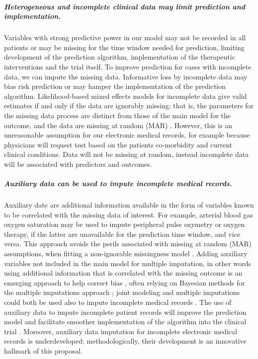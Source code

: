 \documentclass[11pt,notitlepage]{article}
\begin{document}
\subparagraph*{Heterogeneous and incomplete clinical data may limit prediction and implementation.}
Variables with strong predictive power in our model may not be recorded in all patients or may be missing for the time window needed for prediction, limiting development of the prediction algorithm, implementation of the therapeutic interventions and the trial itself. To improve prediction for cases with incomplete data, we can impute the missing data. Informative loss by incomplete data may bias risk prediction or may hamper the implementation of the prediction algorithm. Likelihood-based mixed effects models for incomplete data give valid estimates if and only if the data are ignorably missing; that is, the parameters for the missing data process are distinct from those of the main model for the outcome, and the data are missing at random (MAR) \cite{Rubin_1976}. However, this is an unreasonable assumption for our electronic medical records, for example because physicians will request test based on the patients co-morbidity and current clinical conditions. Data will not be missing at random, instead incomplete data will be associated with predictors and outcomes.

\subparagraph*{Auxiliary data can be used to impute incomplete medical records.}
Auxiliary date are additional information available in the form of variables known to be correlated with the missing data of interest. For example, arterial blood gas oxygen saturation may be used to impute peripheral pulse oxymetry or oxygen therapy, if the latter are unavailable for the prediction time window, and vice versa. This approach avoids the perils associated with missing at random (MAR) assumptions, when fitting a non-ignorable missingness model \cite{Wang_20029935}. Adding auxiliary variables not included in the main model for multiple imputation, in other words using additional information that is correlated with the missing outcome is an emerging approach to help correct bias \cite{Meng_1994, Collins_11778676, Rubin_1996}, often relying on Bayesian methods for the multiple imputations approach \cite{Daniels_2008, Schafer_1997}; joint modeling and multiple imputations could both be used also to impute incomplete medical records \cite{Fitzmaurice_2008}. The use of auxiliary data to impute incomplete patient records will improve the prediction model and facilitate smoother implementation of the algorithm into the clinical trial \cite{Hall_25389642}. Moreover, auxiliary data imputation for incomplete electronic medical records is underdeveloped; methodologically, their development is an innovative hallmark of this proposal.
\end{document}
